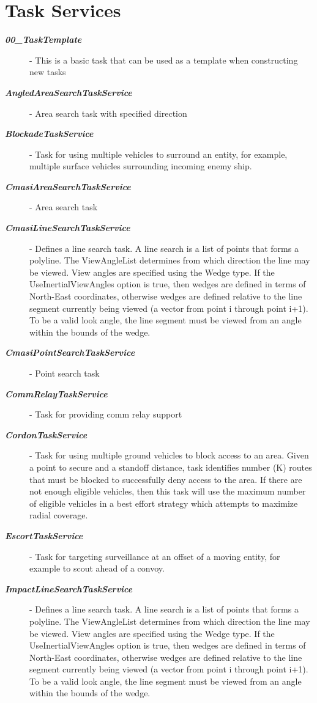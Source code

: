 \section{Task Services}
\begin{description}
	\item[\textbf{\textit{00\_TaskTemplate}}] - This is a basic task that can be used as a template when constructing new tasks
	\item[\textbf{\textit{AngledAreaSearchTaskService}}] - Area search task with specified direction 
	\item[\textbf{\textit{BlockadeTaskService}}] - Task for using multiple vehicles to surround an entity, for example, multiple surface vehicles surrounding incoming enemy ship.
	\item[\textbf{\textit{CmasiAreaSearchTaskService}}] - Area search task
	\item[\textbf{\textit{CmasiLineSearchTaskService}}] - Defines a line search task. A line search is a list of points that forms a polyline. The ViewAngleList determines from which direction the line may be viewed. View angles are specified using the Wedge type. If the UseInertialViewAngles option is true, then wedges are defined in terms of North-East coordinates, otherwise wedges are defined relative to the line segment currently being viewed (a vector from point i through point i+1). To be a valid look angle, the line segment must be viewed from an angle within the bounds of the wedge. 
	\item[\textbf{\textit{CmasiPointSearchTaskService}}] - Point search task 
	\item[\textbf{\textit{CommRelayTaskService}}] - Task for providing comm relay support  
	\item[\textbf{\textit{CordonTaskService}}] - Task for using multiple ground vehicles to block access to an area. Given a point to secure and a standoff distance, task identifies number (K) routes that must be blocked to successfully deny access to the area. If there are not enough eligible vehicles, then this task will use the maximum number of eligible vehicles in a best effort strategy which attempts to maximize radial coverage. 
	\item[\textbf{\textit{EscortTaskService}}] - Task for targeting surveillance at an offset of a moving entity, for example to scout ahead of a convoy. 
	\item[\textbf{\textit{ImpactLineSearchTaskService}}] - Defines a line search task. A line search is a list of points that forms a polyline. The ViewAngleList determines from which direction the line may be viewed. View angles are specified using the Wedge type. If the UseInertialViewAngles option is true, then wedges are defined in terms of North-East coordinates, otherwise wedges are defined relative to the line segment currently being viewed (a vector from point i through point i+1). To be a valid look angle, the line segment must be viewed from an angle within the bounds of the wedge.

\end{description}
